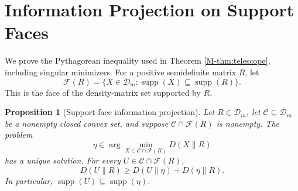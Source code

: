 \documentclass[twoside]{article}
\newtheorem{proposition}[theorem]{Proposition}
\newcommand{\Dens}{\mathcal D}
\newcommand{\C}{\mathcal C}
\newcommand{\supp}{\operatorname{supp}}
\begin{document}
\runningauthor{}
\appendix

\section{Information Projection on Support Faces}
\label{app:projection}

We prove the Pythagorean inequality used in Theorem \ref{M-thm:telescope}, including singular minimizers. For a positive semidefinite matrix $R$, let
\begin{equation}
\mathcal F(R)=\{X\in\Dens_m:\supp(X)\subseteq\supp(R)\}.
\end{equation}
This is the face of the density-matrix set supported by $R$.

\begin{proposition}[Support-face information projection]
\label{prop:face-projection}
Let $R\in\Dens_m$, let $\C\subseteq\Dens_m$ be a nonempty closed convex set, and suppose $\C\cap\mathcal F(R)$ is nonempty. The problem
\begin{equation}
\eta\in\arg\min_{X\in\C\cap\mathcal F(R)}D(X\|R)
\label{eq:face-problem}
\end{equation}
has a unique solution. For every $U\in\C\cap\mathcal F(R)$,
\begin{equation}
D(U\|R)\geq D(U\|\eta)+D(\eta\|R).
\label{eq:face-pythagoras}
\end{equation}
In particular, $\supp(U)\subseteq\supp(\eta)$.
\end{proposition}
\end{document}
